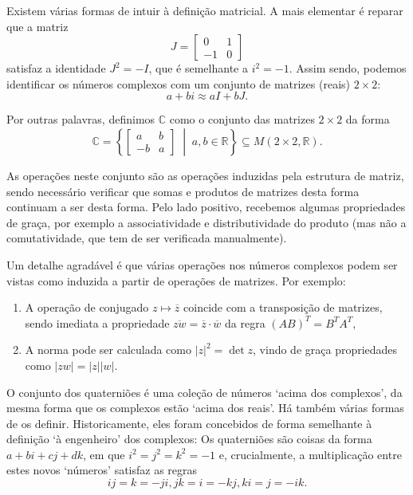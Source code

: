 \documentclass{article}
\newcommand{\R}{\mathbb{R}}
\newcommand{\C}{\mathbb{C}}
\begin{document}
Existem várias formas de intuir à definição matricial. A mais elementar é reparar que a matriz
\[J = \begin{bmatrix} 0 & 1 \\ -1 & 0 \end{bmatrix}\]
satisfaz a identidade $J^2 = -I$, que é semelhante a $i^2 = -1$. Assim sendo, podemos identificar os números complexos com um conjunto de matrizes (reais) $2 \times 2$:
\[a + bi \approx a I + b J.\]

Por outras palavras, definimos $\C$ como o conjunto das matrizes $2 \times 2$ da forma
\[\C = \left\{ \begin{bmatrix} a & b \\ -b & a \end{bmatrix} \;\middle|\; a, b \in \R \right\} \subseteq M(2 \times 2, \R).\]

As operações neste conjunto são as operações induzidas pela estrutura de matriz, sendo necessário verificar que somas e produtos de matrizes desta forma continuam a ser desta forma. Pelo lado positivo, recebemos algumas propriedades de graça, por exemplo a associatividade e distributividade do produto (mas não a comutatividade, que tem de ser verificada manualmente).

Um detalhe agradável é que várias operações nos números complexos podem ser vistas como induzida a partir de operações de matrizes. Por exemplo:
\begin{enumerate}
\item A operação de conjugado $z \mapsto \overline{z}$ coincide com a transposição de matrizes, sendo imediata a propriedade $\overline{zw} = \overline{z} \cdot \overline{w}$ da regra $(AB)^T = B^T A^T$,
\item A norma pode ser calculada como $\lvert z \rvert^2 = \det z$, vindo de graça propriedades como $\lvert z w \rvert = \lvert z \rvert \lvert w \rvert$.
\end{enumerate}

\medskip

O conjunto dos quaterniões é uma coleção de números `acima dos complexos', da mesma forma que os complexos estão `acima dos reais'. Há também várias formas de os definir. Historicamente, eles foram concebidos de forma semelhante à definição `à engenheiro' dos complexos: Os quaterniões são coisas da forma $a+bi+cj+dk$, em que $i^2 = j^2 = k^2 = -1$ e, crucialmente, a multiplicação entre estes novos `números' satisfaz as regras
\[ ij = k = -ji , jk = i = -kj, ki = j = -ik.\]
\end{document}
